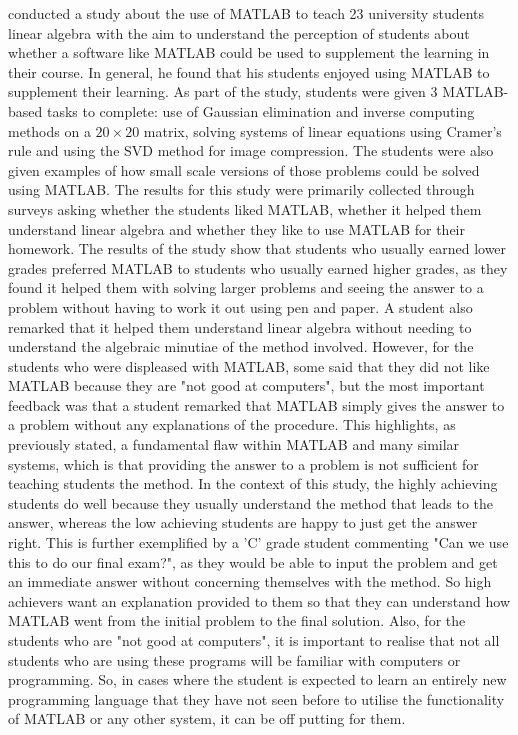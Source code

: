 \documentclass[natbib]{llncs}
\begin{document}
\cite{matlab} conducted a study about the use of MATLAB to teach 23 university students linear algebra with the aim to understand the perception of students about whether a software like MATLAB could be used to supplement the learning in their course. In general, he found that his students enjoyed using MATLAB to supplement their learning. As part of the study, students were given 3 MATLAB-based tasks to complete: use of Gaussian elimination and inverse computing methods on a $20\times20$ matrix, solving systems of linear equations using Cramer's rule and using the SVD method for image compression. The students were also given examples of how small scale versions of those problems could be solved using MATLAB. The results for this study were primarily collected through surveys asking whether the students liked MATLAB, whether it helped them understand linear algebra and whether they like to use MATLAB for their homework. The results of the study show that students who usually earned lower grades preferred MATLAB to students who usually earned higher grades, as they found it helped them with solving larger problems and seeing the answer to a problem without having to work it out using pen and paper. A student also remarked that it helped them understand linear algebra without needing to understand the algebraic minutiae of the method involved. However, for the students who were displeased with MATLAB, some said that they did not like MATLAB because they are "not good at computers", but the most important feedback was that a student remarked that MATLAB simply gives the answer to a problem without any explanations of the procedure. This highlights, as previously stated, a fundamental flaw within MATLAB and many similar systems, which is that providing the answer to a problem is not sufficient for teaching students the method. In the context of this study, the highly achieving students do well because they usually understand the method that leads to the answer, whereas the low achieving students are happy to just get the answer right. This is further exemplified by a 'C' grade student commenting "Can we use this to do our final exam?", as they would be able to input the problem and get an immediate answer without concerning themselves with the method. So high achievers want an explanation provided to them so that they can understand how MATLAB went from the initial problem to the final solution. Also, for the students who are "not good at computers", it is important to realise that not all students who are using these programs will be familiar with computers or programming. So, in cases where the student is expected to learn an entirely new programming language that they have not seen before to utilise the functionality of MATLAB or any other system, it can be off putting for them.
\end{document}
